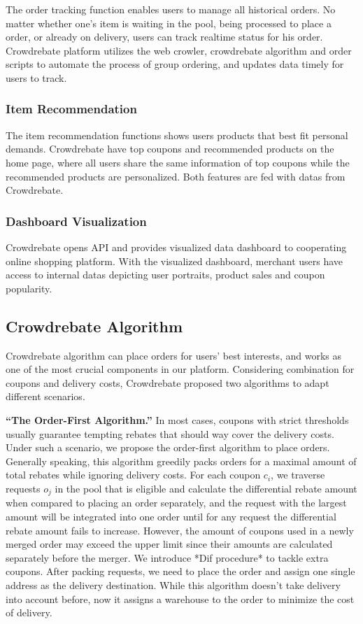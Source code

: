 The order tracking function enables users to manage all historical orders. No matter whether one's item is waiting in the pool, being processed to place a order, or already on delivery, users can track realtime status for his order. Crowdrebate platform utilizes the web crowler, crowdrebate algorithm and order scripts to automate the process of group ordering, and updates data timely for users to track.
	
\subsubsection{Item Recommendation}

The item recommendation functions shows users products that best fit personal demands. Crowdrebate  have top coupons and recommended products on the home page, where all users share the same information of top coupons while the recommended products are personalized. Both features are fed with datas from Crowdrebate.

\subsubsection{Dashboard Visualization}

Crowdrebate opens API and provides visualized data dashboard to cooperating online shopping platform. With the visualized dashboard, merchant users have access to internal datas depicting user portraits, product sales and coupon popularity.

\subsection{Crowdrebate Algorithm}

Crowdrebate algorithm can place orders for users' best interests, and works as one of the most crucial components in our platform. Considering combination for coupons and delivery costs, Crowdrebate proposed two algorithms to adapt different scenarios.

\textbf{``The Order-First Algorithm.''} In most cases, coupons with strict thresholds usually guarantee tempting rebates that should way cover the delivery costs. Under such a scenario, we propose the order-first algorithm to place orders. Generally speaking, this algorithm greedily packs orders for a maximal amount of total rebates while ignoring delivery costs. For each coupon $c_i$, we traverse requests $o_j$ in the pool that is eligible and calculate the differential rebate amount when compared to placing an order separately, and the request with the largest amount will be integrated into one order until for any request the differential rebate amount fails to increase. However, the amount of coupons used in a newly merged order may exceed the upper limit since their amounts are calculated separately before the merger. We introduce *Dif procedure* to tackle extra coupons. After packing requests, we need to place the order and assign one single address as the delivery destination. While this algorithm doesn't take delivery into account before, now it assigns a warehouse to the order to minimize the cost of delivery.


